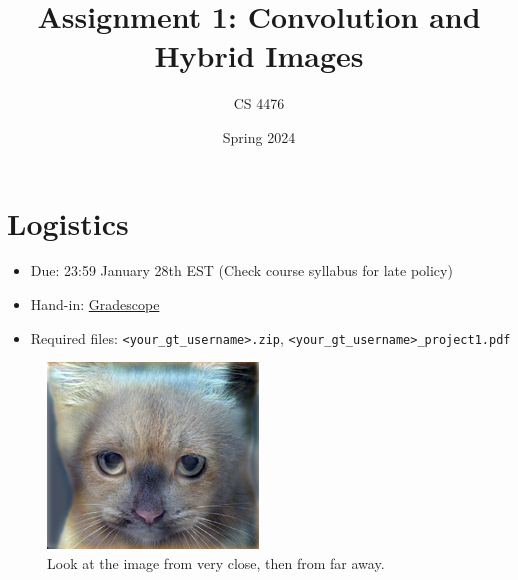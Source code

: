 \documentclass{article}
\title{Assignment 1: Convolution and Hybrid Images}
\author{CS 4476}
\date{Spring 2024}
\begin{document}
\maketitle

\section*{Logistics}
\begin{itemize}
    \item Due: 23:59 January 28th EST (Check course syllabus for late policy)
    \item{Hand-in: \href{https://www.gradescope.com}{Gradescope}}
    \item{Required files: \lstinline{<your_gt_username>.zip}, \lstinline{<your_gt_username>_project1.pdf}}
\end{itemize}

\begin{figure}[htt]
    \centering
    \includegraphics[width=0.5\textwidth]{images/hybrid_image.jpg}
    \caption{Look at the image from very close, then from far away.}
    \label{fig:hybrid}
\end{figure}
\end{document}
